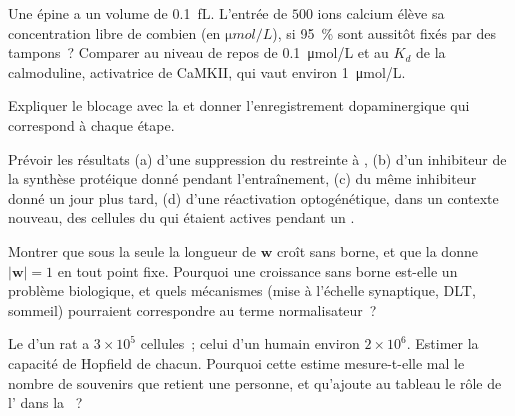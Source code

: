 \begin{exercise}[$\star\star$]\label{exo:b3:learning-memory:7}
Une épine a un volume de \qty{0.1}{fL}. L'entrée de $500$ ions calcium
élève sa concentration libre de combien (en $\unit{\micro mol/L}$), si
\qty{95}{\%} sont aussitôt fixés par des tampons~? Comparer au niveau de
repos de \qty{0.1}{\micro mol/L} et au $K_{d}$ de la calmoduline,
activatrice de CaMKII, qui vaut environ \qty{1}{\micro mol/L}.
\end{exercise}

\begin{exercise}[$\star\star$]\label{exo:b3:learning-memory:8}
Expliquer le blocage avec la  et donner
l'enregistrement dopaminergique qui correspond à chaque étape.
\end{exercise}

\begin{exercise}[$\star\star$]\label{exo:b3:learning-memory:9}
Prévoir les résultats (a) d'une suppression du  restreinte
à , (b) d'un inhibiteur de la synthèse protéique donné pendant
l'entraînement, (c) du même inhibiteur donné un jour plus tard, (d)
d'une réactivation optogénétique, dans un contexte nouveau, des cellules
du  qui étaient actives pendant un .
\end{exercise}

\begin{exercise}[$\star\star\star$]\label{exo:b3:learning-memory:10}
Montrer que sous la seule  la longueur de $\mathbf{w}$
croît sans borne, et que la  donne $|\mathbf{w}| = 1$ en tout
point fixe. Pourquoi une croissance sans borne est-elle un problème
biologique, et quels mécanismes (mise à l'échelle synaptique, DLT,
sommeil) pourraient correspondre au terme normalisateur~?
\end{exercise}

\begin{exercise}[$\star\star\star$]\label{exo:b3:learning-memory:11}
Le  d'un rat a $3\times 10^{5}$ cellules~; celui d'un humain environ
$2\times 10^{6}$. Estimer la capacité de Hopfield de chacun. Pourquoi
cette estime mesure-t-elle mal le nombre de souvenirs que retient une
personne, et qu'ajoute au tableau le rôle de l' dans la
~?
\end{exercise}

